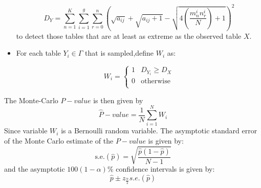 \documentclass[12pt,oneside]{report}
\theoremstyle{definition}
\theoremstyle{mystyle}
\begin{document}
\begin{itemize}
	\begin{equation}\label{tukey}
	D_{Y}=\sum\limits_{n=1}^{K}\sum\limits_{i=1}^{g}\sum\limits_{r=0}^{n}\left(\sqrt{a_{ij}}+\sqrt{a_{ij}+1}-\sqrt{4\left(\frac{m_{n}^{i}n_{r}^{i}}{N}\right)+1}  \right)^{2} 
	\end{equation}
	 to detect those tables that are at least as extreme as the observed table $X$.
	\item For each table $Y_{i}\in \Gamma $ that is sampled,define $W_{i}$ as:
	
	\[ W_{i}=\begin{cases}
	1 & D_{Y_{i}}\geq D_{X}  \\
	0 & \text{otherwise} \\
	\end{cases}
	\]
	
\end{itemize}


The Monte-Carlo $P-value$ is then given by
\begin{equation*}
\hat{P}-value=\frac{1}{N}\sum\limits_{i=1}^{N}W_{i}
\end{equation*}
Since variable $W_{i}$ is a Bernoulli random variable. The asymptotic standard error of the Monte Carlo estimate of the $P-value$ is given by:
\begin{equation*}
\text{s.e.}(\hat{p})=\sqrt{\frac{\hat{p}(1-\hat{p})}{N-1}}
\end{equation*}
and  the asymptotic $100(1-\alpha)\%$ confidence intervals is given by:
\begin{equation*}
\hat{p}\pm z_{\frac{\alpha}{2}}s.e.(\hat{p})
\end{equation*}
\end{document}
